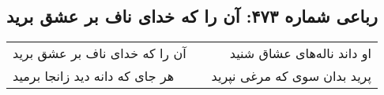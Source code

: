 \begin{center}
\section*{رباعی شماره ۴۷۳: آن را که خدای ناف بر عشق برید}
\label{sec:0473}
\begin{longtable}{l p{0.5cm} r}
آن را که خدای ناف بر عشق برید
&&
او داند ناله‌های عشاق شنید
\\
هر جای که دانه دید زانجا برمید
&&
پرید بدان سوی که مرغی نپرید
\\
\end{longtable}
\end{center}
